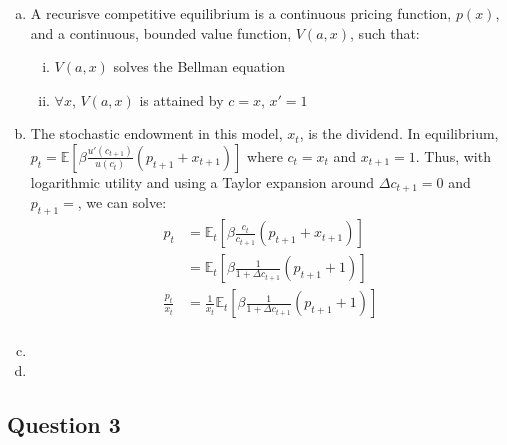 \documentclass{article}
\newcommand{\dc}[1]{\Delta c_{#1}}
\newcommand{\E}[1]{\mathbb{E}\left[#1\right]} %
\newcommand{\Et}[1]{\mathbb{E}_t\left[#1\right]}
\begin{document}
\begin{enumerate}[(a)]
	\item A recurisve competitive equilibrium is a continuous pricing function, $p(x)$, and a continuous, bounded value function, $V(a,x)$, such that:
		\begin{enumerate}[(i)]
			\item $V(a,x)$ solves the Bellman equation 
			\item $\forall x$, $V(a,x)$ is attained by $c=x$, $x'=1$
		\end{enumerate}
	
	\item The stochastic endowment in this model, $x_t$, is the dividend. In equilibrium, ${p_t = \E{\beta\frac{u'(c_{t+1})}{u(c_t)}(p_{t+1}+x_{t+1})}}$ where ${c_t=x_t}$ and ${x_{t+1}=1}$. Thus, with logarithmic utility and using a Taylor expansion around ${\dc{t+1}=0}$ and ${p_{t+1}=}$, we can solve:
		\begin{align*}
			p_t 			&= \Et{\beta\frac{c_t}{c_{t+1}}(p_{t+1}+x_{t+1})}			\\
							&= \Et{\beta\frac{1}{1+\dc{t+1}}(p_{t+1}+1)}				\\
			\frac{p_t}{x_t}	&= \frac{1}{x_t}\Et{\beta\frac{1}{1+\dc{t+1}}(p_{t+1}+1)}	\\
		\end{align*}
	
	
	\item 
	
	
	\item 
	
	
\end{enumerate}

\subsection*{Question 3}
\end{document}
